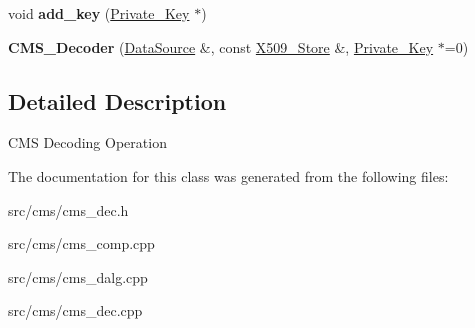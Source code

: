 \begin{DoxyCompactItemize}
\item 
\hypertarget{classBotan_1_1CMS__Decoder_a5f19d12ea79727e35f75bb9ec33bb7ac}{void {\bfseries add\-\_\-key} (\hyperlink{classBotan_1_1Private__Key}{Private\-\_\-\-Key} $\ast$)}\label{classBotan_1_1CMS__Decoder_a5f19d12ea79727e35f75bb9ec33bb7ac}

\item 
\hypertarget{classBotan_1_1CMS__Decoder_a2bc7db6d90a7a40404618c789709fa49}{{\bfseries C\-M\-S\-\_\-\-Decoder} (\hyperlink{classBotan_1_1DataSource}{Data\-Source} \&, const \hyperlink{classBotan_1_1X509__Store}{X509\-\_\-\-Store} \&, \hyperlink{classBotan_1_1Private__Key}{Private\-\_\-\-Key} $\ast$=0)}\label{classBotan_1_1CMS__Decoder_a2bc7db6d90a7a40404618c789709fa49}

\end{DoxyCompactItemize}


\subsection{Detailed Description}
C\-M\-S Decoding Operation 

The documentation for this class was generated from the following files\-:\begin{DoxyCompactItemize}
\item 
src/cms/cms\-\_\-dec.\-h\item 
src/cms/cms\-\_\-comp.\-cpp\item 
src/cms/cms\-\_\-dalg.\-cpp\item 
src/cms/cms\-\_\-dec.\-cpp\end{DoxyCompactItemize}
